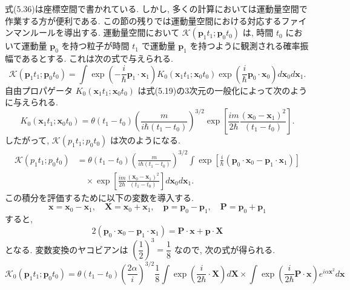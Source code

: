 \documentclass{jsarticle}
\begin{document}
    式(5.36)は座標空間で書かれている. しかし, 多くの計算においては運動量空間で作業する方が便利である. この節の残りでは運動量空間における対応するファインマンルールを導出する. 運動量空間において $\mathcal{K}(\mathbf{p}_1 t_1; \mathbf{p}_0 t_0)$ は, 時間 $t_0$ において運動量 $\mathbf{p}_0$ を持つ粒子が時間 $t_1$ で運動量 $\mathbf{p}_1$ を持つように観測される確率振幅であるとする. これは次の式で与えられる.
\begin{equation*}
        \mathcal{K}(\mathbf{p}_1 t_1; \mathbf{p}_0 t_0) = \int \exp \left( -\frac{i}{\hbar} \mathbf{p}_1 \cdot \mathbf{x}_1 \right) K_0(\mathbf{x}_1 t_1; \mathbf{x}_0 t_0) \exp \left( \frac{i}{\hbar} \mathbf{p}_0 \cdot \mathbf{x}_0 \right) d\mathbf{x}_0 d\mathbf{x}_1. \tag{5.38}
\end{equation*}
自由プロパゲータ $K_0(\mathbf{x}_1 t_1; \mathbf{x}_0 t_0)$ は式(5.19)の3次元の一般化によって次のように与えられる.
\begin{equation*}
    K_0(\mathbf{x}_1 t_1; \mathbf{x}_0 t_0) = \theta(t_1 - t_0) \left( \frac{m}{i\hbar(t_1 - t_0)} \right)^{3/2} \exp \left[ \frac{im}{2\hbar} \frac{(\mathbf{x}_0 - \mathbf{x}_1)^2}{(t_1 - t_0)} \right]. \tag{5.39}
\end{equation*}
したがって, $\mathcal{K}(p_1 t_1; p_0 t_0)$ は次のようになる.
\begin{align*}
    \mathcal{K}(p_1 t_1; p_0 t_0) &= \theta(t_1 - t_0) \left( \frac{m}{i\hbar(t_1 - t_0)} \right)^{3/2} \int \exp\left[ \frac{i}{\hbar}(\mathbf{p}_0 \cdot \mathbf{x}_0 - \mathbf{p}_1 \cdot \mathbf{x}_1) \right]\\
    &\quad \times \exp\left[ \frac{im}{2\hbar} \frac{(\mathbf{x}_0 - \mathbf{x}_1)^2}{(t_1 - t_0)} \right]d\mathbf{x}_0 d\mathbf{x}_1.
\end{align*}
この積分を評価するために以下の変数を導入する.
\begin{equation*}
    \mathbf{x} = \mathbf{x}_0 - \mathbf{x}_1, \quad \mathbf{X} = \mathbf{x}_0 + \mathbf{x}_1, \quad \mathbf{p} = \mathbf{p}_0 - \mathbf{p}_1, \quad \mathbf{P} = \mathbf{p}_0 + \mathbf{p}_1
\end{equation*}
すると, 
\begin{equation*}
    2(\mathbf{p}_0 \cdot \mathbf{x}_0 - \mathbf{p}_1 \cdot \mathbf{x}_1) = \mathbf{P} \cdot \mathbf{x} + \mathbf{p} \cdot \mathbf{X}
\end{equation*}
となる. 変数変換のヤコビアンは $\left( \dfrac{1}{2} \right)^3 = \dfrac{1}{8}$ なので, 次の式が得られる.
\begin{equation*}
    \mathcal{K}_0(\mathbf{p}_1 t_1; \mathbf{p}_0 t_0) = \theta(t_1 - t_0) \left( \frac{2\alpha}{i} \right)^{3/2} \frac{1}{8}\int \exp \left( \frac{i}{2\hbar} \mathbf{} \cdot \mathbf{X} \right)d\mathbf{X} \times  \int \exp \left( \frac{i}{2\hbar} \mathbf{P} \cdot \mathbf{x} \right)e^{i\alpha\mathbf{x}^2}  d\mathbf{x}
\end{equation*}
\end{document}

